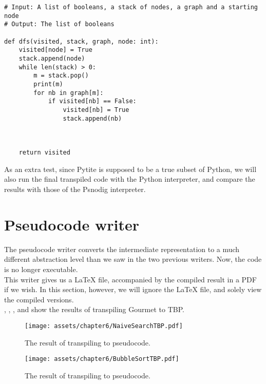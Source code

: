 \begin{lstlisting}[caption={The result of transpiling \Cref{dfsGourmet} to Pytite.}, captionpos=b, label={dfsPytite}]
# Input: A list of booleans, a stack of nodes, a graph and a starting node
# Output: The list of booleans

def dfs(visited, stack, graph, node: int):
    visited[node] = True
    stack.append(node)
    while len(stack) > 0:
        m = stack.pop()
        print(m)
        for nb in graph[m]:
            if visited[nb] == False:
                visited[nb] = True
                stack.append(nb)



    return visited
\end{lstlisting}

As an extra test, since Pytite is supposed to be a true subset of Python, we will also run the final transpiled code with the Python interpreter, and compare the results with those of the Psnodig interpreter. \\


\section{Pseudocode writer}

The pseudocode writer converts the intermediate representation to a much different abstraction level than we saw in the two previous writers. Now, the code is no longer executable. \\

This writer gives us a LaTeX file, accompanied by the compiled result in a PDF if we wish. In this section, however, we will ignore the LaTeX file, and solely view the compiled versions. \\

, , , and  show the results of transpiling Gourmet to TBP. \\

\begin{figure}[ht!]
    \centering
    \texttt{[image: assets/chapter6/NaiveSearchTBP.pdf]}
    \caption{The result of transpiling  to pseudocode.}
    \label{naiveSearchTBP}
\end{figure}

\begin{figure}[ht!]
    \centering
    \texttt{[image: assets/chapter6/BubbleSortTBP.pdf]}
    \caption{The result of transpiling  to pseudocode.}
    \label{bubbleSortTBP}
\end{figure}

